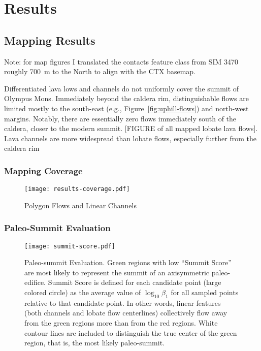 \chapter{Results}

\section{Mapping Results}

Note: for map figures I translated the contacts feature class from SIM 3470 roughly \qty{700}{\m} to the North to align with the \ac{CTX} basemap.

Differentiated lava lows and channels do not uniformly cover the summit of Olympus Mons. Immediately beyond the caldera rim, distinguishable flows are limited mostly to the south-east (e.g., Figure~\ref{fig:uphill-flows}) and north-west margins. Notably, there are essentially zero flows immediately south of the caldera, closer to the modern summit. [FIGURE of all mapped lobate lava flows]. Lava channels are more widespread than lobate flows, especially further from the caldera rim 

\subsection{Mapping Coverage}
\begin{figure}
    \texttt{[image: results-coverage.pdf]}%
    \caption[Mapping Coverage]{Polygon Flows and Linear Channels}%
    \label{fig:results-coverage}
\end{figure}

\subsection{Paleo-Summit Evaluation}
\begin{figure}
    \texttt{[image: summit-score.pdf]}%
    \caption[Paleo-Summit Evaluation]{Paleo-summit Evaluation. Green regions with low ``Summit Score'' are most likely to represent the summit of an axisymmetric paleo-edifice. Summit Score is defined for each candidate point (large colored circle) as the average value of $\log_{10}\beta_1$ for all sampled points relative to that candidate point. In other words, linear features (both channels and lobate flow centerlines) collectively flow away from the green regions more than from the red regions. White contour lines are included to distinguish the true center of the green region, that is, the most likely paleo-summit.}%
    \label{fig:summit-score}
\end{figure}

